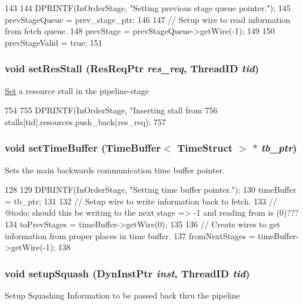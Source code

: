 \begin{DoxyCode}
143 {
144     DPRINTF(InOrderStage, "Setting previous stage queue pointer.\n");
145     prevStageQueue = prev_stage_ptr;
146 
147     // Setup wire to read information from fetch queue.
148     prevStage = prevStageQueue->getWire(-1);
149 
150     prevStageValid = true;
151 }
\end{DoxyCode}
\hypertarget{classPipelineStage_af11246f186567b60383a2ff1d4bcf27c}{
\subsubsection[{setResStall}]{\setlength{\rightskip}{0pt plus 5cm}void setResStall ({\bf ResReqPtr} {\em res\_\-req}, \/  {\bf ThreadID} {\em tid})}}
\label{classPipelineStage_af11246f186567b60383a2ff1d4bcf27c}
\hyperlink{classSet}{Set} a resource stall in the pipeline-\/stage 


\begin{DoxyCode}
754 {
755     DPRINTF(InOrderStage, "Inserting stall from %
756     stalls[tid].resources.push_back(res_req);
757 }
\end{DoxyCode}
\hypertarget{classPipelineStage_a2b521ea5f191fff72265f60d4ed5187b}{
\subsubsection[{setTimeBuffer}]{\setlength{\rightskip}{0pt plus 5cm}void setTimeBuffer ({\bf TimeBuffer}$<$ {\bf TimeStruct} $>$ $\ast$ {\em tb\_\-ptr})}}
\label{classPipelineStage_a2b521ea5f191fff72265f60d4ed5187b}
Sets the main backwards communication time buffer pointer. 


\begin{DoxyCode}
128 {
129     DPRINTF(InOrderStage, "Setting time buffer pointer.\n");
130     timeBuffer = tb_ptr;
131 
132     // Setup wire to write information back to fetch.
133     // @todo: should this be writing to the next stage => -1 and reading from is 
      (0)???
134     toPrevStages = timeBuffer->getWire(0);
135 
136     // Create wires to get information from proper places in time buffer.
137     fromNextStages = timeBuffer->getWire(-1);
138 }
\end{DoxyCode}
\hypertarget{classPipelineStage_a9c19142b0bc2ce7b7a6593a5190cebc7}{
\subsubsection[{setupSquash}]{\setlength{\rightskip}{0pt plus 5cm}void setupSquash ({\bf DynInstPtr} {\em inst}, \/  {\bf ThreadID} {\em tid})}}
\label{classPipelineStage_a9c19142b0bc2ce7b7a6593a5190cebc7}
Setup Squashing Information to be passed back thru the pipeline 


